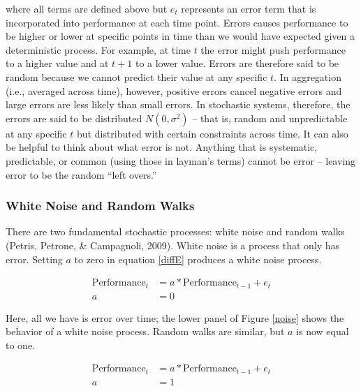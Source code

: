 \documentclass[english,,man]{apa6}
\theoremstyle{definition}
\theoremstyle{definition}
\theoremstyle{definition}
\theoremstyle{remark}
\begin{document}
\noindent where all terms are defined above but \(e_{t}\) represents an
error term that is incorporated into performance at each time point.
Errors causes performance to be higher or lower at specific points in
time than we would have expected given a deterministic process. For
example, at time \(t\) the error might push performance to a higher
value and at \(t+1\) to a lower value. Errors are therefore said to be
random because we cannot predict their value at any specific \(t\). In
aggregation (i.e., averaged across time), however, positive errors
cancel negative errors and large errors are less likely than small
errors. In stochastic systems, therefore, the errors are said to be
distributed \(N(0, \sigma^2)\) -- that is, random and unpredictable at
any specific \(t\) but distributed with certain constraints across time.
It can also be helpful to think about what error is not. Anything that
is systematic, predictable, or common (using those in layman's terms)
cannot be error -- leaving error to be the random \enquote{left overs.}

\hypertarget{white-noise-and-random-walks}{%
\subsubsection{White Noise and Random
Walks}\label{white-noise-and-random-walks}}

There are two fundamental stochastic processes: white noise and random
walks (Petris, Petrone, \& Campagnoli, 2009). White noise is a process
that only has error. Setting \(a\) to zero in equation \ref{diffE}
produces a white noise process.

\begin{equation}
\begin{split}
\label{whitenoise}
\textrm{Performance}_{t} &= a * \textrm{Performance}_{t-1} + e_{t} \\
a &= 0
\end{split}
\end{equation}

\noindent Here, all we have is error over time; the lower panel of
Figure \ref{noise} shows the behavior of a white noise process. Random
walks are similar, but \(a\) is now equal to one.

\begin{equation}
\begin{split}
\label{rw}
\textrm{Performance}_{t} &= a * \textrm{Performance}_{t-1} + e_{t} \\ 
a &= 1 \\ 
\end{split}
\end{equation}
\end{document}

